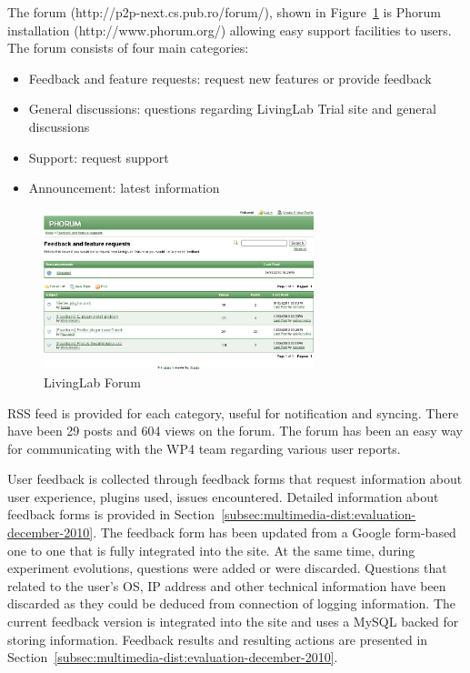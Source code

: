The forum (http://p2p-next.cs.pub.ro/forum/), shown in
Figure~\ref{fig:multimedia-dist:upb-living-lab-forum} is Phorum installation (http://www.phorum.org/) allowing easy support facilities to users. The forum consists of four main categories:
\begin{itemize}
  \item Feedback and feature requests: request new features or provide
  feedback
  \item General discussions: questions regarding LivingLab Trial site and general discussions
  \item Support: request support
  \item Announcement: latest information
\end{itemize}

\begin{figure}
  \centering
  \includegraphics[width=0.7\textwidth]{src/img/multimedia-dist/upb-living-lab-forum}
  \caption{LivingLab Forum}
  \label{fig:multimedia-dist:upb-living-lab-forum}
\end{figure}

RSS feed is provided for each category, useful for notification and syncing.
There have been 29 posts and 604 views on the forum. The forum has been an
easy way for communicating with the WP4 team regarding various user reports.

User feedback is collected through feedback forms that request information
about user experience, plugins used, issues encountered. Detailed information
about feedback forms is provided in
Section~\ref{subsec:multimedia-dist:evaluation-december-2010}. The feedback
form has been updated from a Google form-based one to one that is fully
integrated into the site. At the same time, during experiment evolutions,
questions were added or were discarded. Questions that related to the user's
OS, IP address and other technical information have been discarded as they
could be deduced from connection of logging information. The current feedback
version is integrated into the site and uses a MySQL backed for storing
information. Feedback results and resulting actions are presented in
Section~\ref{subsec:multimedia-dist:evaluation-december-2010}.

